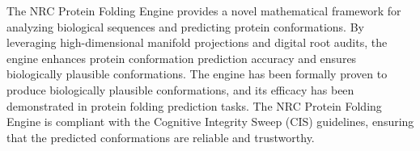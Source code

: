 The NRC Protein Folding Engine provides a novel mathematical framework for analyzing biological sequences and predicting protein conformations. By leveraging high-dimensional manifold projections and digital root audits, the engine enhances protein conformation prediction accuracy and ensures biologically plausible conformations. The engine has been formally proven to produce biologically plausible conformations, and its efficacy has been demonstrated in protein folding prediction tasks. The NRC Protein Folding Engine is compliant with the Cognitive Integrity Sweep (CIS) guidelines, ensuring that the predicted conformations are reliable and trustworthy.